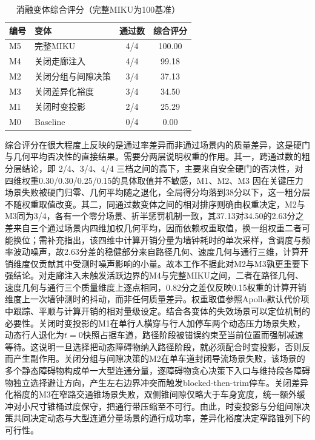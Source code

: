 \documentclass[a4paper,11pt]{ctexart}
\theoremstyle{definition}
\begin{document}
\begin{table}[htbp]
\centering
\caption{消融变体综合评分（完整MIKU为100基准）}
\label{tab:exp_ablation_score}
\small
\begin{tabular}{llcc}
\toprule
\textbf{编号} & \textbf{变体} & \textbf{通过数} & \textbf{综合评分} \\
\midrule
M5 & 完整MIKU             & 4/4 & 100.00 \\
M4 & 关闭走廊注入         & 4/4 & 99.18 \\
M2 & 关闭分组与间隙决策   & 3/4 & 37.13 \\
M3 & 关闭差异化裕度       & 3/4 & 34.50 \\
M1 & 关闭时变投影         & 2/4 & 25.29 \\
M0 & Baseline             & 0/4 & 0.00 \\
\bottomrule
\end{tabular}
\end{table}

综合评分在很大程度上反映的是通过率差异而非通过场景内的质量差异，这是硬门与几何平均否决性的直接结果。需要分两层说明权重的作用。其一，跨通过数的粗分层结论，即 2/4、3/4、4/4 三档之间的高下，主要来自安全硬门的否决性，对四维权重0.30/0.30/0.25/0.15的具体取值并不敏感，M1、M2、M3 因在关键压力场景失败被硬门归零、几何平均随之退化，全局得分均落到38分以下，这一粗分层不随权重取值改变。其二，同通过数变体之间的相对排序则确由权重决定，M2与M3同为3/4，各有一个零分场景、折半惩罚机制一致，其37.13对34.50的2.63分之差来自三个通过场景内四维加权几何平均，因而依赖权重取值，换一组权重二者可能换位；需补充指出，该四维中计算开销分量为墙钟耗时的单次采样，含调度与频率波动噪声，故2.63分差的稳健部分来自路径几何、速度几何与通行三维，计算开销维度仅贡献其中受测时噪声影响的小量。故本工作不据此对M2与M3孰更重要下强结论。对走廊注入未触发活跃边界的M4与完整MIKU之间，二者在路径几何、速度几何与通行三个质量维度上逐点相同，0.82分之差仅反映0.15权重的计算开销维度上一次墙钟测时的抖动，而非任何质量差异。权重取值参照Apollo默认代价项中跟踪、平顺与计算开销的相对量级设定。结合各变体的失效场景可以定位机制的必要性。关闭时变投影的M1在单行人横穿与行人加停车两个动态压力场景失败，动态行人退化为$t=0$快照占据车道，路径阶段被错误约束至当前位置而强制减速等待。这说明一旦选择把动态障碍物纳入路径阶段，就必须配合时变投影，否则反而产生副作用。关闭分组与间隙决策的M2在单车道封闭导流场景失败，该场景的多个静态障碍物构成单一大型连通分量，逐障碍物贪心决策下入口与维持段各障碍物独立选择避让方向，产生左右边界冲突而触发blocked-then-trim停车。关闭差异化裕度的M3在窄路交通锥场景失败，双侧锥间隙仅略大于车身宽度，统一额外缓冲对小尺寸锥桶过度保守，把通行带压缩至不可行。由此，时变投影与分组间隙决策共同决定动态与大型连通分量场景的通行成功率，差异化裕度决定窄路锥列下的可行性。
\end{document}
